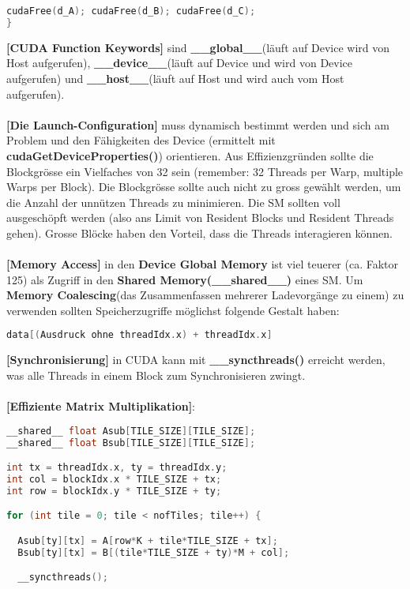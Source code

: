 \documentclass[8pt]{extarticle}
\let\oldtextbf\textbf
\renewcommand{\textbf}{\tiny\oldtextbf}
\begin{document}
\begin{multicols*}{5}
\begin{lstlisting}[language=c]
  cudaFree(d_A); cudaFree(d_B); cudaFree(d_C);
}
\end{lstlisting}
\textbf{[CUDA Function Keywords]} sind \textbf{\_\_global\_\_}(läuft auf Device wird von Host aufgerufen), \textbf{\_\_device\_\_}(läuft auf Device und wird von Device aufgerufen) und \textbf{\_\_host\_\_}(läuft auf Host und wird auch vom Host aufgerufen).\\\\
\textbf{[Die Launch-Configuration]} muss dynamisch bestimmt werden und sich am Problem und den Fähigkeiten des Device (ermittelt mit \textbf{cudaGetDeviceProperties()}) orientieren. Aus Effizienzgründen sollte die Blockgrösse ein Vielfaches von 32 sein (remember: 32 Threads per Warp, multiple Warps per Block). Die Blockgrösse sollte auch nicht zu gross gewählt werden, um die Anzahl der unnützen Threads zu minimieren. Die SM sollten voll ausgeschöpft werden (also ans Limit von Resident Blocks und Resident Threads gehen). Grosse Blöcke haben den Vorteil, dass die Threads interagieren können.\\\\
\textbf{[Memory Access]} in den \textbf{Device Global Memory} ist viel teuerer (ca. Faktor 125) als Zugriff in den \textbf{Shared Memory(\_\_shared\_\_)} eines SM. Um \textbf{Memory Coalescing}(das Zusammenfassen mehrerer Ladevorgänge zu einem) zu verwenden sollten Speicherzugriffe möglichst folgende Gestalt haben:
\begin{lstlisting}[language=c]
data[(Ausdruck ohne threadIdx.x) + threadIdx.x]
\end{lstlisting}
\textbf{[Synchronisierung]} in CUDA kann mit \textbf{\_\_syncthreads()} erreicht werden, was alle Threads in einem Block zum Synchronisieren zwingt.\\\\
\textbf{[Effiziente Matrix Multiplikation]}:
\begin{lstlisting}[language=c]
__shared__ float Asub[TILE_SIZE][TILE_SIZE];
__shared__ float Bsub[TILE_SIZE][TILE_SIZE];

int tx = threadIdx.x, ty = threadIdx.y;
int col = blockIdx.x * TILE_SIZE + tx;
int row = blockIdx.y * TILE_SIZE + ty;

for (int tile = 0; tile < nofTiles; tile++) {

  Asub[ty][tx] = A[row*K + tile*TILE_SIZE + tx];
  Bsub[ty][tx] = B[(tile*TILE_SIZE + ty)*M + col];

  __syncthreads();


\end{lstlisting}
\end{multicols*}
\end{document}
